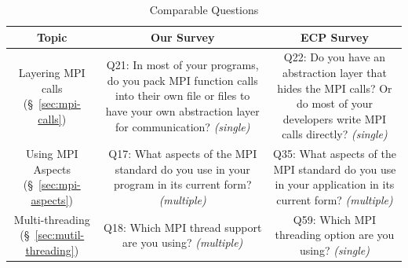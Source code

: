 \documentclass[preprint,5p,times]{elsarticle}
\begin{document}
{\begin{table}[tb]
\begin{center}
\begin{tabular}[t]{c|c}
      \hline
    \end{tabular}%
  \end{center}%
\end{table}%
}{
\begin{table}[tb]%
  \begin{center}%
    \caption{Comparable Questions}%
    \label{tab:comparable-questions}%
    \begin{tabular}[t]{c||c|c}
      \hline
      Topic & Our Survey & ECP Survey \\
      \hline
      \hline
      \begin{minipage}[t]{0.13\hsize}
        Layering MPI calls
        (\S~\ref{sec:mpi-calls})
      \end{minipage}
      &
      \begin{minipage}[t]{0.39\hsize}
        Q21: In most of your programs, do you pack MPI function calls into
        their own file or files to have your own abstraction layer for
        communication?  {\it(single)}
      \end{minipage}
      &
      \begin{minipage}[t]{0.39\hsize}
        Q22: Do you have an abstraction layer that hides the MPI calls? Or do
        most of your developers write MPI calls directly? {\it(single)}
      \end{minipage}
      \\
      \hline
      \begin{minipage}[t]{0.13\hsize}
        Using MPI Aspects
        (\S~\ref{sec:mpi-aspects})
      \end{minipage}
      &
      \begin{minipage}[t]{0.39\hsize}
        Q17: What aspects of the MPI standard do you use in your program in its
        current form? {\it(multiple)}
      \end{minipage}
      &
      \begin{minipage}[t]{0.39\hsize}
        Q35: What aspects of the MPI standard do you use in your application in
        its current form? {\it(multiple)}
      \end{minipage}
      \\
      \hline
      \begin{minipage}[t]{0.13\hsize}
        Multi-threading
        (\S~\ref{sec:mutil-threading})
      \end{minipage}
      &
      \begin{minipage}[t]{0.39\hsize}
        Q18: Which MPI thread support are you using? {\it(multiple)}
      \end{minipage}
      &
      \begin{minipage}[t]{0.39\hsize}
        Q59: Which MPI threading option are you using? {\it(single)}
      \end{minipage}
      \\
      \hline
    \end{tabular}%
  \end{center}%
\end{table}%
}
\end{document}
